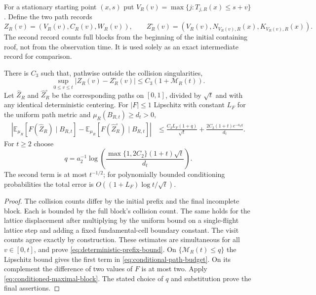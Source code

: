 For a stationary starting point $(x,s)$ put
$V_R(v)=\max\{j:T_{j,R}(x)\le s+v\}$. Define the two path records
\[
 Z_R(v)=(V_R(v),C_R(v),W_R(v)),\qquad
 Z_R^\circ(v)=(V_R(v),N_{V_R(v),R}(x),K_{V_R(v),R}(x)).
\]
The second record counts full blocks from the beginning of the initial
containing roof, not from the observation time. It is used solely as an
exact intermediate record for comparison.

\begin{corollary}
\label{cor:conditional-path-budget}
There is $C_3$ such that, pathwise outside the collision singularities,
\begin{equation}\label{eq:deterministic-prefix-bound}
 \sup_{0\le v\le t}|Z_R(v)-Z_R^\circ(v)|
                         \le C_3(1+\mathcal M_R(t)).
\end{equation}
Let $\widehat Z_R$ and $\widehat Z_R^\circ$ be the corresponding paths
on $[0,1]$, divided by $\sqrt t$ and with any identical deterministic
centering. For $|F|\le1$ Lipschitz with constant $L_F$ for the uniform
path metric and $\mu_R(B_{R,t})\ge d_t>0$,
\begin{align}\label{eq:conditional-path-budget}
 \left|\mathbb E_{\mu_R}[F(\widehat Z_R)\mid B_{R,t}]
       -\mathbb E_{\mu_R}[F(\widehat Z_R^\circ)\mid B_{R,t}]\right|
 &\le\frac{C_3L_F(1+q)}{\sqrt t}
        +\frac{2C_2(1+t)e^{-a_2q}}{d_t}.
\end{align}
For $t\ge2$ choose
\begin{equation}\label{eq:conditional-log-budget}
 q=a_2^{-1}\log\left(\frac{\max\{1,2C_2\}(1+t)\sqrt t}{d_t}\right).
\end{equation}
The second term is at most $t^{-1/2}$; for polynomially bounded
conditioning probabilities the total error is
$O((1+L_F)\log t/\sqrt t)$.
\end{corollary}
\begin{proof}
The collision counts differ by the initial prefix and the final
incomplete block. Each is bounded by the full block's collision count.
The same holds for the lattice displacement after multiplying by the
uniform bound on a single-flight lattice step and adding a fixed
fundamental-cell boundary constant. The visit counts agree exactly by
construction. These estimates are simultaneous for all $v\in[0,t]$,
and prove \eqref{eq:deterministic-prefix-bound}. On
$\{\mathcal M_R(t)\le q\}$ the Lipschitz bound gives the first term in
\eqref{eq:conditional-path-budget}. On its complement the difference of
two values of $F$ is at most two. Apply
\eqref{eq:conditioned-maximal-block}. The stated choice of $q$ and
substitution prove the final assertions.
\end{proof}


